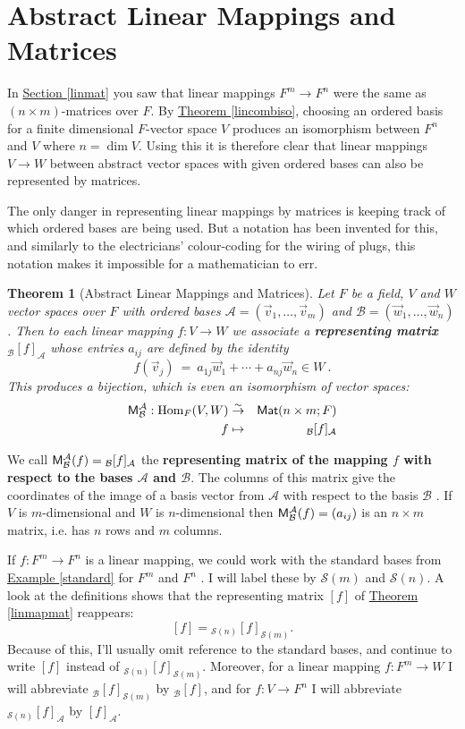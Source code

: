 \documentclass[11pt]{amsbook}
\newtheorem{theorem}{Theorem}[section]
\theoremstyle{definition}
\begin{document}
\section{Abstract Linear Mappings and Matrices}
In \hyperref[linmat]{Section \ref{linmat}} you saw that linear mappings $F^m\to F^n$ were the same as $(n\times m)$-matrices over $F$. By \hyperref[lincombiso]{Theorem \ref{lincombiso}}, choosing an ordered basis for a finite dimensional $F$-vector space $V$ produces an isomorphism between $F^{n}$ and $V$ where $n= \dim V$. Using this it is therefore clear that linear mappings $V\to W$ between abstract vector spaces with given ordered bases can also be represented by matrices.

The only danger in representing linear mappings by matrices is keeping track of which ordered bases are being used. But a notation has been invented for this, and similarly to the electricians' colour-coding for the wiring of plugs, this notation makes it impossible for a mathematician to err.

\begin{theorem}[Abstract Linear Mappings and Matrices] \label{abslinmap}
Let $F$ be a field, $V$ and $W$ vector spaces over $F$ with ordered bases $\mathcal{A} = ( \vec{v}_1, \ldots , \vec{v}_m)$ and $\mathcal{B} = (\vec{w}_1, \ldots , \vec{w}_n)$. Then to each linear mapping $f: V\to W$ we associate a {\bf representing matrix} ${}_{\mathcal{B}}[f]_{\mathcal{A}}$ whose entries $a_{ij}$ are defined by the identity
$$f({\vec v}_j)~ =~ a_{1j} \vec{w}_1 + \cdots + a_{nj} \vec{w}_n\in W~.$$ This produces a bijection, which is even an isomorphism of vector spaces: \begin{eqnarray*}{\sf M}_{\mathcal{B}}^{\mathcal{A}}: {\rm Hom}_F(V,W)&\stackrel{\sim}{\to}& {\sf Mat}(n\times m; F)  \\ f & \mapsto & {}_{\mathcal{B}}[f]_{\mathcal{A}}\end{eqnarray*}
\end{theorem}
We call ${\sf M}_{\mathcal{B}}^{\mathcal{A}}(f) = {}_{\mathcal{B}}[f]_{\mathcal{A}}$ the {\bf representing matrix of the mapping $f$ with respect to the bases $\mathcal{A}$ and $\mathcal{B}$}. The columns of this matrix give the coordinates of the image of a basis vector from $\mathcal{A}$ with respect to the basis $\mathcal{B}$ . If $V$ is $m$-dimensional and $W$ is $n$-dimensional then ${\sf M}_{\mathcal{B}}^{\mathcal{A}}(f)=(a_{ij})$ is an $n \times m$ matrix, i.e. has $n$ rows and $m$ columns.


If $f : F^m\to F^n$ is a linear mapping, we could work with the standard bases  from \hyperref[standard]{Example \ref{standard}} for $F^m$ and $F^n$ . I will label these by $\mathcal{S}(m)$ and $\mathcal{S}(n)$. A look at the definitions shows that the representing matrix $[f]$ of \hyperref[linmapmat]{Theorem \ref{linmapmat}} reappears:
$$ [f] = {}_{\mathcal{S}(n)}[f]_{\mathcal{S}(m)}.$$ Because of this, I'll usually omit reference to the standard bases, and continue to write $[f]$ instead of ${}_{\mathcal{S}(n)}[f]_{\mathcal{S}(m)}$. Moreover, for a linear mapping $f: F^m \to W$ I will abbreviate ${}_{\mathcal{B}}[f]_{\mathcal{S}(m)}$ by ${}_{\mathcal{B}}[f]$, and for $f:V\to F^n$ I will abbreviate ${}_{\mathcal{S}(n)}[f]_{\mathcal{A}}$ by $[f]_{\mathcal{A}}$.
\end{document}

